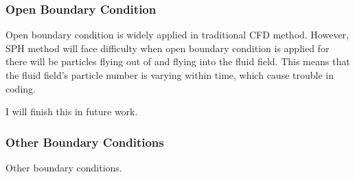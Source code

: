 \subsubsection{Open Boundary Condition}

Open boundary condition is widely applied in traditional CFD method.
However, 
SPH method will face difficulty when open boundary condition is applied for
there will be particles flying out of and flying into the fluid field.
This means that the fluid field's particle number is varying within time, 
which cause trouble in coding.

I will finish this in future work.

\subsubsection{Other Boundary Conditions}

Other boundary conditions.
